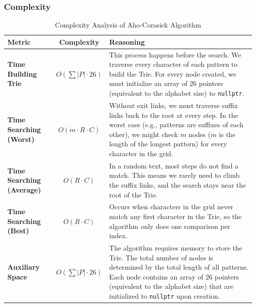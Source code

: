     \subsubsection{Complexity}
    \begin{table}[H]
    \centering
    \renewcommand{\arraystretch}{1.5}
    \begin{tabular}{|l|c|p{8cm}|}
    \hline
    \textbf{Metric} & \textbf{Complexity} & \textbf{Reasoning} \\ \hline
    \textbf{Time Building Trie} & $O(\sum |P| \cdot 26)$ & This process happens before the search.
    We traverse every character of each pattern to build the Trie.
    For every node created, we must initialize an array of 26 pointers (equivalent to the alphabet size) to \texttt{nullptr}. \\ \hline    
    \textbf{Time Searching (Worst)} & $O(m \cdot R \cdot C)$ & Without exit links, we must traverse suffix links back to the root at every step.
    In the worst case (e.g., patterns are suffixes of each other), we might check $m$ nodes ($m$ is the length of the longest pattern) for every character in the grid. \\ \hline
    \textbf{Time Searching (Average)} & $O(R \cdot C)$ & In a random text, most steps do not find a match. This means we rarely need to climb the suffix links, and the search stays near the root of the Trie. \\ \hline
    \textbf{Time Searching (Best)} & $O(R \cdot C)$ & Occurs when characters in the grid never match any first character in the Trie, so the algorithm only does one comparison per index. \\ \hline
    \textbf{Auxiliary Space} & $O(\sum |P| \cdot 26)$ & The algorithm requires memory to store the Trie. The total number of nodes is determined by the total length of all patterns. 
    Each node contains an array of 26 pointers (equivalent to the alphabet size) that are initialized to \texttt{nullptr} upon creation. \\ \hline    
    \end{tabular}
    \caption{Complexity Analysis of Aho-Corasick Algorithm}
    \end{table}

